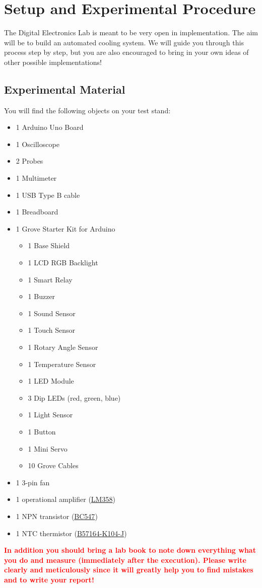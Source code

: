 \section{Setup and Experimental Procedure}\label{sec:exp}
The Digital Electronics Lab is meant to be very open in implementation. The aim will be to build an automated cooling system. We will guide you through this process step by step, but you are also encouraged to bring in your own ideas of other possible implementations!

\subsection{Experimental Material}\label{sec:material}
You will find the following objects on your test stand:
\begin{itemize}
	\item 1 Arduino Uno Board
	\item 1 Oscilloscope
	\item 2 Probes 
	\item 1 Multimeter
	\item 1 \ac{USB} Type B cable
	\item 1 Breadboard
	\item 1 Grove Starter Kit for Arduino
	\begin{itemize}
		\item 1 Base Shield
		\item 1 LCD RGB Backlight
		\item 1 Smart Relay
		\item 1 Buzzer
		\item 1 Sound Sensor
		\item 1 Touch Sensor
		\item 1 Rotary Angle Sensor
		\item 1 Temperature Sensor
		\item 1 LED Module
		\item 3 Dip LEDs (red, green, blue)
		\item 1 Light Sensor
		\item 1 Button
		\item 1 Mini Servo
		\item 10 Grove Cables
	\end{itemize}
	\item 1 3-pin fan
	\item 1 operational amplifier (\href{http://www.ti.com/lit/ds/symlink/lm158-n.pdf}{LM358})
	\item 1 NPN transistor (\href{https://www.sparkfun.com/datasheets/Components/BC546.pdf}{BC547})
	\item 1 \ac{NTC} thermistor (\href{https://eu.mouser.com/datasheet/2/400/NTC_Leaded_disks_K164-1317145.pdf}{B57164-K104-J})
\end{itemize}\vspace*{10pt}\noindent
\textcolor{red}{\textbf{In addition you should bring a lab book to note down everything what you do and measure (immediately after the execution). Please write clearly and meticulously since it will greatly help you to find mistakes and to write your report!}}

